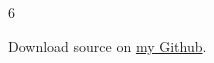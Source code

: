 \documentclass[9pt,landscape]{memoir}
\begin{document}
\begin{multicols}{6}
\begin{description}
\end{description}

Download source on \href{https://github.com/IllyaStarikov/cs3800}{my Github}.

\end{multicols}
\end{document}
